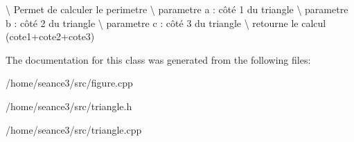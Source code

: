 \textbackslash{} Permet de calculer le perimetre \textbackslash{} parametre a \+: côté 1 du triangle \textbackslash{} parametre b \+: côté 2 du triangle \textbackslash{} parametre c \+: côté 3 du triangle \textbackslash{} retourne le calcul (cote1+cote2+cote3) 

The documentation for this class was generated from the following files\+:\begin{DoxyCompactItemize}
\item 
/home/seance3/src/figure.\+cpp\item 
/home/seance3/src/triangle.\+h\item 
/home/seance3/src/triangle.\+cpp\end{DoxyCompactItemize}
